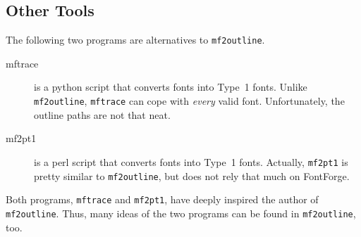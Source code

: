 \documentclass{scrartcl}
\begin{document}
\subsection{Other Tools}
%
The following two programs are alternatives to \verb|mf2outline|.
%
\begin{description}
	\item[mftrace] is a python script that converts \MF{} fonts into Type~1 fonts. Unlike \verb|mf2outline|, \verb|mftrace| can cope with \emph{every} valid \MF{} font. Unfortunately, the outline paths are not that neat.
	\item[mf2pt1] is a perl script that converts \MF{} fonts into Type~1 fonts. Actually, \verb|mf2pt1| is pretty similar to \verb|mf2outline|, but does not rely that much on FontForge.
\end{description}
%
Both programs, \verb|mftrace| and \verb|mf2pt1|, have deeply inspired the author of \verb|mf2outline|. Thus, many ideas of the two programs can be found in \verb|mf2outline|, too.
%
\end{document}
